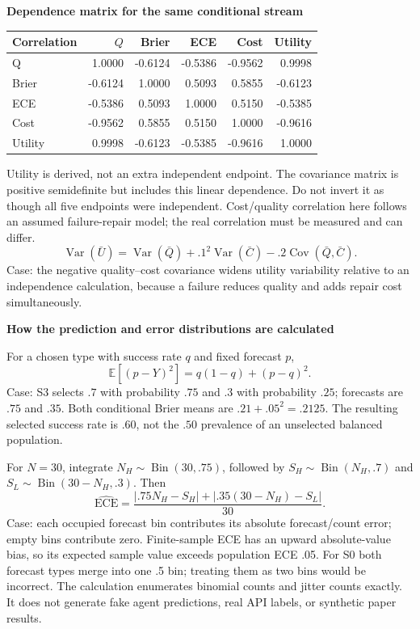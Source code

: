 \documentclass[10pt,a4paper]{article}
\newcommand{\lead}[1]{\vspace{3pt}\textbf{#1}\par}
\begin{document}
\lead{Dependence matrix for the same conditional stream}
\begin{center}\small
\begin{tabular*}{\linewidth}{@{\extracolsep{\fill}}lrrrrr@{}}\toprule
Correlation & $Q$ & Brier & ECE & Cost & Utility\\\midrule
Q & 1.0000 & -0.6124 & -0.5386 & -0.9562 & 0.9998\\
Brier & -0.6124 & 1.0000 & 0.5093 & 0.5855 & -0.6123\\
ECE & -0.5386 & 0.5093 & 1.0000 & 0.5150 & -0.5385\\
Cost & -0.9562 & 0.5855 & 0.5150 & 1.0000 & -0.9616\\
Utility & 0.9998 & -0.6123 & -0.5385 & -0.9616 & 1.0000\\
\bottomrule\end{tabular*}\end{center}
Utility is derived, not an extra independent endpoint. The covariance matrix
is positive semidefinite but includes this linear dependence. Do not invert
it as though all five endpoints were independent. Cost/quality correlation
here follows an assumed failure-repair model; the real correlation must be
measured and can differ.
\[
 \operatorname{Var}(\bar U)=\operatorname{Var}(\bar Q)
 +.1^2\operatorname{Var}(\bar C)-.2\operatorname{Cov}(\bar Q,\bar C).
\]
Case: the negative quality--cost covariance widens utility variability relative
to an independence calculation, because a failure reduces quality and adds
repair cost simultaneously.

\lead{How the prediction and error distributions are calculated}
For a chosen type with success rate $q$ and fixed forecast $p$,
\[
 \mathbb E[(p-Y)^2]=q(1-q)+(p-q)^2.
\]
Case: S3 selects $.7$ with probability $.75$ and $.3$ with probability $.25$;
forecasts are $.75$ and $.35$. Both conditional Brier means are
$.21+.05^2=.2125$. The resulting selected success rate is $.60$, not the
$.50$ prevalence of an unselected balanced population.

For $N=30$, integrate $N_H\sim\operatorname{Bin}(30,.75)$, followed by
$S_H\sim\operatorname{Bin}(N_H,.7)$ and
$S_L\sim\operatorname{Bin}(30-N_H,.3)$. Then
\[
 \widehat{\mathrm{ECE}}=
 \frac{|.75N_H-S_H|+|.35(30-N_H)-S_L|}{30}.
\]
Case: each occupied forecast bin contributes its absolute forecast/count error;
empty bins contribute zero. Finite-sample ECE has an upward absolute-value bias,
so its expected sample value exceeds population ECE .05. For S0 both forecast
types merge into one .5 bin; treating them as two bins would be incorrect.
The calculation enumerates binomial counts and jitter counts exactly. It does
not generate fake agent predictions, real API labels, or synthetic paper results.
\end{document}
